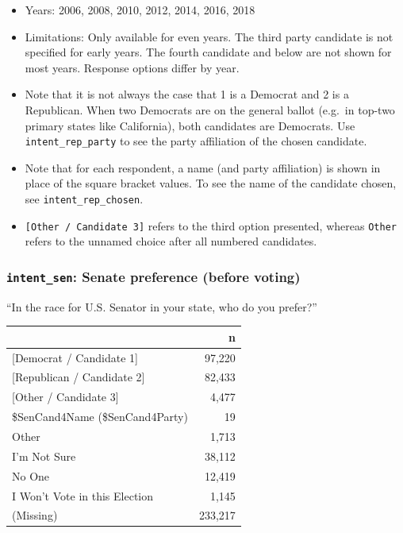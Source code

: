\documentclass[10pt,article,oneside]{memoir}
\theoremstyle{definition}
\begin{document}
\begin{itemize}
\tightlist
\item
  Years: 2006, 2008, 2010, 2012, 2014, 2016, 2018
\item
  Limitations: Only available for even years. The third party candidate
  is not specified for early years. The fourth candidate and below are
  not shown for most years. Response options differ by year.
\item
  Note that it is not always the case that 1 is a Democrat and 2 is a
  Republican. When two Democrats are on the general ballot (e.g.~in
  top-two primary states like California), both candidates are
  Democrats. Use \texttt{intent\_rep\_party} to see the party
  affiliation of the chosen candidate.
\item
  Note that for each respondent, a name (and party affiliation) is shown
  in place of the square bracket values. To see the name of the
  candidate chosen, see \texttt{intent\_rep\_chosen}.
\item
  \texttt{{[}Other\ /\ Candidate\ 3{]}} refers to the third option
  presented, whereas \texttt{Other} refers to the unnamed choice after
  all numbered candidates.
\end{itemize}

\hypertarget{intent_sen-senate-preference-before-voting}{%
\subsubsection{\texorpdfstring{\texttt{intent\_sen}: Senate preference
(before
voting)}{intent\_sen: Senate preference (before voting)}}\label{intent_sen-senate-preference-before-voting}}

``In the race for U.S. Senator in your state, who do you prefer?''

\begin{table}[H]
\centering
\begin{tabular}{lr}
\toprule
 & n\\
\midrule
{[Democrat / Candidate 1]} & 97,220\\
{[Republican / Candidate 2]} & 82,433\\
{[Other / Candidate 3]} & 4,477\\
\$SenCand4Name (\$SenCand4Party) & 19\\
Other & 1,713\\
I'm Not Sure & 38,112\\
No One & 12,419\\
I Won't Vote in this Election & 1,145\\
(Missing) & 233,217\\
\bottomrule
\end{tabular}
\end{table}
\end{document}
